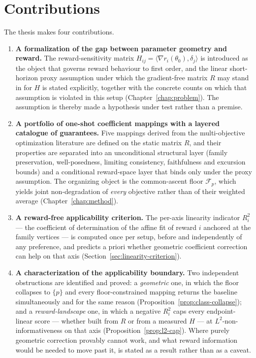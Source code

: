 \documentclass[12pt,a4paper]{report}
\newcommand{\1}{\mathbf{1}}
\newcommand{\Floor}{\mathcal{F}_{p}}
\theoremstyle{definition}
\begin{document}
\section{Contributions}
\label{sec:contributions}

The thesis makes four contributions.

\begin{enumerate}[leftmargin=2.2em,itemsep=4pt]
\item \textbf{A formalization of the gap between parameter geometry and reward.} The reward-sensitivity matrix \(H_{ij}=\langle\nabla r_i(\theta_0),\delta_j\rangle\) is introduced as the object that governs reward behaviour to first order, and the linear short-horizon proxy assumption under which the gradient-free matrix \(R\) may stand in for \(H\) is stated explicitly, together with the concrete counts on which that assumption is violated in this setup (Chapter~\ref{chap:problem}). The assumption is thereby made a hypothesis under test rather than a premise.

\item \textbf{A portfolio of one-shot coefficient mappings with a layered catalogue of guarantees.} Five mappings derived from the multi-objective optimization literature are defined on the static matrix \(R\), and their properties are separated into an unconditional structural layer (family preservation, well-posedness, limiting consistency, faithfulness and excursion bounds) and a conditional reward-space layer that binds only under the proxy assumption. The organizing object is the common-ascent floor \(\Floor\), which yields joint non-degradation of \emph{every} objective rather than of their weighted average (Chapter~\ref{chap:method}).

\item \textbf{A reward-free applicability criterion.} The per-axis linearity indicator \(R^2_i\) --- the coefficient of determination of the affine fit of reward \(i\) anchored at the family vertices --- is computed once per setup, before and independently of any preference, and predicts a priori whether geometric coefficient correction can help on that axis (Section~\ref{sec:linearity-criterion}).

\item \textbf{A characterization of the applicability boundary.} Two independent obstructions are identified and proved: a \emph{geometric} one, in which the floor collapses to \(\{p\}\) and every floor-constrained mapping returns the baseline simultaneously and for the same reason (Proposition~\ref{prop:class-collapse}); and a \emph{reward-landscape} one, in which a negative \(R^2_i\) caps every endpoint-linear score --- whether built from \(R\) or from a measured \(H\) --- at \(L^2\)-non-informativeness on that axis (Proposition~\ref{prop:l2-cap}). Where purely geometric correction provably cannot work, and what reward information would be needed to move past it, is stated as a result rather than as a caveat.
\end{enumerate}
\end{document}
